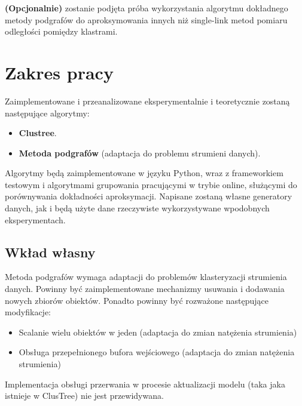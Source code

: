 \documentclass[11pt]{mgr}
\begin{document}
\textbf{(Opcjonalnie)} zostanie podjęta próba wykorzystania algorytmu dokładnego metody podgrafów do aproksymowania innych niż single-link metod pomiaru odległości pomiędzy klastrami. 

\chapter{Zakres pracy}\label{zakres-pracy}

Zaimplementowane i przeanalizowane eksperymentalnie i teoretycznie zostaną następujące algorytmy:

\begin{itemize}
\item
  \textbf{Clustree}.
\item
  \textbf{Metoda podgrafów} (adaptacja do problemu strumieni danych).
\end{itemize}

Algorytmy będą zaimplementowane w języku Python, wraz z frameworkiem testowym i algorytmami grupowania pracującymi w trybie online, służącymi do porównywania dokładności aproksymacji. Napisane zostaną własne generatory danych, jak i będą użyte dane rzeczywiste wykorzystywane wpodobnych eksperymentach.

\section{Wkład własny}\label{wkux142ad-wux142asny}

Metoda podgrafów wymaga adaptacji do problemów klasteryzacji strumienia danych. Powinny być zaimplementowane mechanizmy usuwania i dodawania nowych zbiorów obiektów. Ponadto powinny być rozważone następujące modyfikacje:
\begin{itemize}
\item
  Scalanie wielu obiektów w jeden (adaptacja do zmian natężenia
  strumienia)
\item
  Obsługa przepełnionego bufora wejściowego (adaptacja do zmian
  natężenia strumienia)
\end{itemize}

Implementacja obsługi przerwania w procesie aktualizacji modelu (taka jaka istnieje w ClusTree) nie jest przewidywana.



\end{document}
